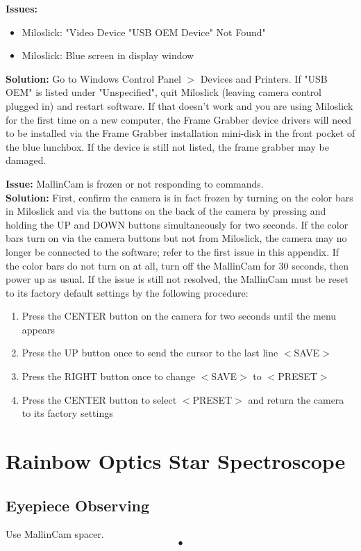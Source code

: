 \documentclass[12pt,titlepage]{article}
\begin{document}
\textbf{\flushleft Issues:}
\begin{itemize}
	\item Miloslick: "Video Device "USB OEM Device" Not Found"
	\item Miloslick: Blue screen in display window
\end{itemize}
\textbf{Solution:} Go to Windows Control Panel $>$ Devices and Printers.
If "USB OEM" is listed under "Unspecified", quit Miloslick (leaving camera control plugged in) and restart software.
If that doesn't work and you are using Miloslick for the first time on a new computer, the Frame Grabber device drivers will need to be installed via the Frame Grabber installation mini-disk in the front pocket of the blue lunchbox. If the device is still not listed, the frame grabber may be damaged.

\textbf{\flushleft Issue:} MallinCam is frozen or not responding to commands.\\
\textbf{Solution:} First, confirm the camera is in fact frozen by turning on the color bars in Miloslick and via the buttons on the back of the camera by pressing and holding the UP and DOWN buttons simultaneously for two seconds. If the color bars turn on via the camera buttons but not from Miloslick, the camera may no longer be connected to the software; refer to the first issue in this appendix. If the color bars do not turn on at all, turn off the MallinCam for 30 seconds, then power up as usual. If the issue is still not resolved, the MallinCam must be reset to its factory default settings by the following procedure:
\begin{enumerate}
	\item Press the CENTER button on the camera for two seconds until the menu appears
	\item Press the UP button once to send the cursor to the last line $<$SAVE$>$
	\item Press the RIGHT button once to change $<$SAVE$>$ to $<$PRESET$>$
	\item Press the CENTER button to select $<$PRESET$>$ and return the camera to its factory settings
\end{enumerate}




\section{Rainbow Optics Star Spectroscope}
\subsection{Eyepiece Observing}
Use MallinCam spacer.\begin{equation}
•
\end{equation}
\end{document}
